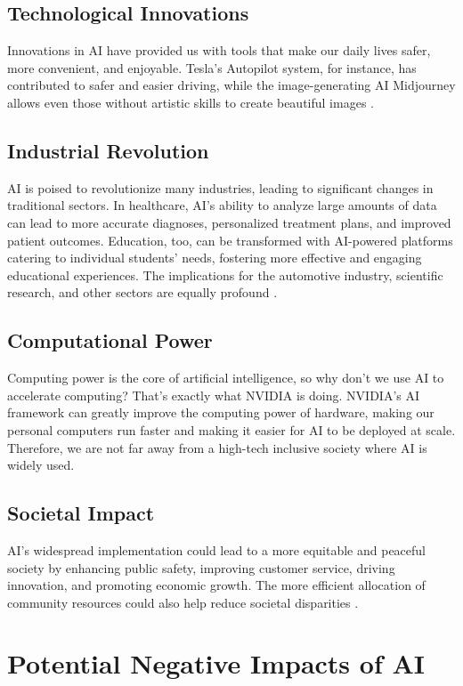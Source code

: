 \documentclass[man]{apa7}
\begin{document}
\subsection{Technological Innovations}
Innovations in AI have provided us with tools that make our daily lives safer, more convenient, and enjoyable. Tesla's Autopilot system, for instance, has contributed to safer and easier driving, while the image-generating AI Midjourney allows even those without artistic skills to create beautiful images \parencite{tesla2021autopilot}.

\subsection{Industrial Revolution}
AI is poised to revolutionize many industries, leading to significant changes in traditional sectors. In healthcare, AI's ability to analyze large amounts of data can lead to more accurate diagnoses, personalized treatment plans, and improved patient outcomes. Education, too, can be transformed with AI-powered platforms catering to individual students' needs, fostering more effective and engaging educational experiences. The implications for the automotive industry, scientific research, and other sectors are equally profound \parencite{jiang2017}.

\subsection{Computational Power}
Computing power is the core of artificial intelligence, so why don't we use AI to accelerate computing? That’s exactly what NVIDIA is doing. NVIDIA's AI framework\parencite{nvidia2020ai} can greatly improve the computing power of hardware, making our personal computers run faster and making it easier for AI to be deployed at scale. Therefore, we are not far away from a high-tech inclusive society where AI is widely used. 

\subsection{Societal Impact}
AI's widespread implementation could lead to a more equitable and peaceful society by enhancing public safety, improving customer service, driving innovation, and promoting economic growth. The more efficient allocation of community resources could also help reduce societal disparities \parencite{brynjolfsson2019}.

\section{Potential Negative Impacts of AI}
\end{document}

